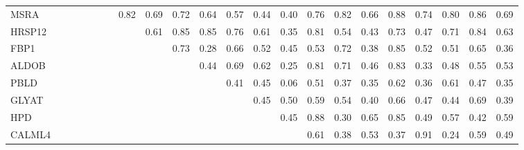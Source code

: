 \begin{longtable}{lrrrrrrrrrrrrrrrrrrrrr}
MSRA     &            &             &            &              &             &            &         0.82 &       0.69 &        0.72 &       0.64 &        0.57 &      0.44 &         0.40 &        0.76 &       0.82 &           0.66 &        0.88 &       0.74 &      0.80 &          0.86 &        0.69 \\
HRSP12   &            &             &            &              &             &            &              &       0.61 &        0.85 &       0.85 &        0.76 &      0.61 &         0.35 &        0.81 &       0.54 &           0.43 &        0.73 &       0.47 &      0.71 &          0.84 &        0.63 \\
FBP1     &            &             &            &              &             &            &              &            &        0.73 &       0.28 &        0.66 &      0.52 &         0.45 &        0.53 &       0.72 &           0.38 &        0.85 &       0.52 &      0.51 &          0.65 &        0.36 \\
ALDOB    &            &             &            &              &             &            &              &            &             &       0.44 &        0.69 &      0.62 &         0.25 &        0.81 &       0.71 &           0.46 &        0.83 &       0.33 &      0.48 &          0.55 &        0.53 \\
PBLD     &            &             &            &              &             &            &              &            &             &            &        0.41 &      0.45 &         0.06 &        0.51 &       0.37 &           0.35 &        0.62 &       0.36 &      0.61 &          0.47 &        0.35 \\
GLYAT    &            &             &            &              &             &            &              &            &             &            &             &      0.45 &         0.50 &        0.59 &       0.54 &           0.40 &        0.66 &       0.47 &      0.44 &          0.69 &        0.39 \\
HPD      &            &             &            &              &             &            &              &            &             &            &             &           &         0.45 &        0.88 &       0.30 &           0.65 &        0.85 &       0.49 &      0.57 &          0.42 &        0.59 \\
CALML4   &            &             &            &              &             &            &              &            &             &            &             &           &              &        0.61 &       0.38 &           0.53 &        0.37 &       0.91 &      0.24 &          0.59 &        0.49 \\

\end{longtable}
